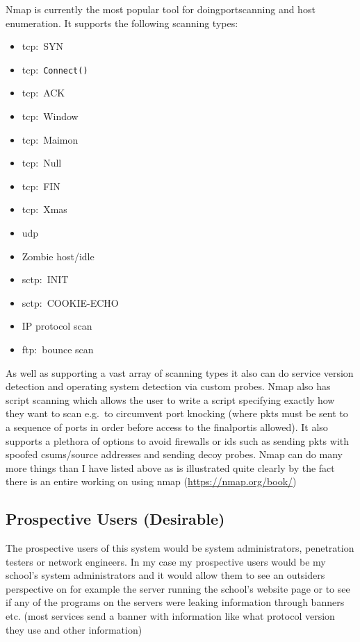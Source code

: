\documentclass[titlepage]{article}
\let\Oldsubsection\subsection{}
\renewcommand{\subsection}{\FloatBarrier\Oldsubsection}
\begin{document}
Nmap is currently the most popular tool for doing\gls{port}scanning and host enumeration.
It supports the following scanning types:

\begin{itemize}
\item{\gls{tcp}:\ SYN}
\item{\gls{tcp}:\ \verb|Connect()|}
\item{\gls{tcp}:\ ACK}
\item{\gls{tcp}:\ Window}
\item{\gls{tcp}:\ Maimon}
\item{\gls{tcp}:\ Null}
\item{\gls{tcp}:\ FIN}
\item{\gls{tcp}:\ Xmas}
\item{\gls{udp}}
\item{Zombie host/idle}
\item{\gls{sctp}:\ INIT}
\item{\gls{sctp}:\ COOKIE-ECHO}
\item{IP protocol scan}
\item{\gls{ftp}:\ bounce scan}
\end{itemize}

As well as supporting a vast array of scanning types it also can do \gls{service} version detection
and operating system detection via custom probes. Nmap also has script scanning which allows
the user to write a script specifying exactly how they want to scan e.g.\ to circumvent \gls{port knocking}
(where \glspl{pkt} must be sent to a sequence of \glspl{port} in order before access to the final\gls{port}is allowed).
It also supports a plethora of options to avoid firewalls or \gls{ids} such as sending
\glspl{pkt} with spoofed \glspl{csum}/source addresses and sending decoy probes. Nmap can do many more things than I
have listed above as is illustrated quite clearly by the fact there is an entire working on using nmap
(\href{https://nmap.org/book/}{https://nmap.org/book/})

\subsection{Prospective Users (Desirable)}

The prospective users of this system would be system administrators, penetration testers or network engineers.
In my case my prospective users would be my school's system administrators and it would allow them to see an
outsiders perspective on for example the \gls{server} running the school's website page or to see if any of the
programs on the \glspl{server} were leaking information through \glspl{banner} etc. (most \glspl{service} send a \gls{banner} with
information like what protocol version they use and other information)
\end{document}

